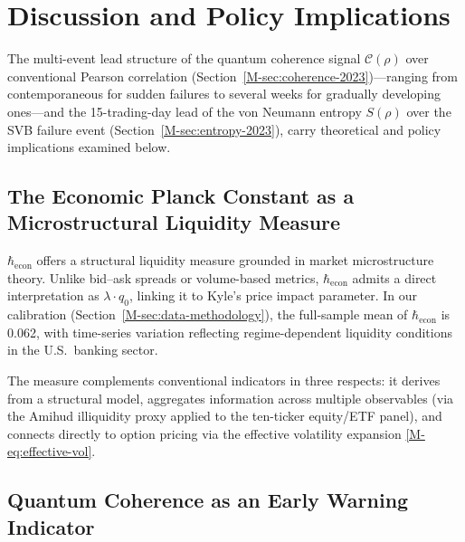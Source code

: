 
\section{Discussion and Policy Implications}\label{sec:discussion}

The multi-event lead structure of the quantum coherence signal $\mathcal{C}(\rho)$ over
conventional Pearson correlation (Section~\ref{M-sec:coherence-2023})---ranging
from contemporaneous for sudden failures to several weeks for gradually developing
ones---and the
15-trading-day lead of the von Neumann entropy $S(\rho)$ over the SVB failure
event (Section~\ref{M-sec:entropy-2023}), carry theoretical and policy implications
examined below.

\subsection{The Economic Planck Constant as a Microstructural Liquidity Measure}
\label{sec:hbar-liquidity}

$\hbar_{\mathrm{econ}}$ offers a structural liquidity measure grounded in market
microstructure theory. Unlike bid--ask spreads or volume-based metrics,
$\hbar_{\mathrm{econ}}$ admits a direct interpretation as $\lambda \cdot q_0$,
linking it to Kyle's price impact parameter. In our calibration
(Section~\ref{M-sec:data-methodology}), the full-sample mean of
$\hbar_{\mathrm{econ}}$ is 0.062, with time-series variation reflecting
regime-dependent liquidity conditions in the U.S.\ banking sector.

The measure complements conventional indicators in three respects: it derives from
a structural model, aggregates information across multiple observables (via the
Amihud illiquidity proxy applied to the ten-ticker equity/ETF panel), and connects
directly to option pricing via the effective volatility expansion
\eqref{M-eq:effective-vol}.

\subsection{Quantum Coherence as an Early Warning Indicator}
\label{sec:coherence-early-warning}

